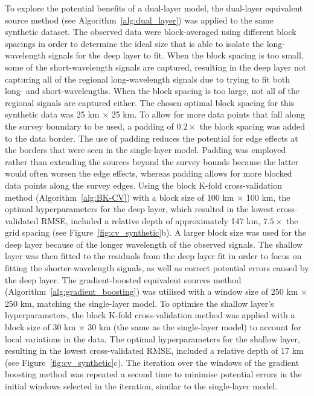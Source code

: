To explore the potential benefits of a dual-layer model, the dual-layer equivalent source method (see Algorithm~\ref{alg:dual_layer}) was applied to the same synthetic dataset. The observed data were block-averaged using different block spacings in order to determine the ideal size that is able to isolate the long-wavelength signals for the deep layer to fit. When the block spacing is too small, some of the short-wavelength signals are captured, resulting in the deep layer not capturing all of the regional long-wavelength signals due to trying to fit both long- and short-wavelengths. When the block spacing is too large, not all of the regional signals are captured either. The chosen optimal block spacing for this synthetic data was 25 km $\times$ 25 km. To allow for more data points that fall along the survey boundary to be used, a padding of $0.2 \times $ the block spacing was added to the data border. The use of padding reduces the potential for edge effects at the borders that were seen in the single-layer model. Padding was employed rather than extending the sources beyond the survey bounds because the latter would often worsen the edge effects, whereas padding allows for more blocked data points along the survey edges. Using the block K-fold cross-validation method (Algorithm~\ref{alg:BK-CV}) with a block size of 100 km $\times$ 100 km, the optimal hyperparameters for the deep layer, which resulted in the lowest cross-validated RMSE, included a relative depth of approximately 147 km, $7.5 \times$ the grid spacing (see Figure~\ref{fig:cv_synthetic}b). A larger block size was used for the deep layer because of the longer wavelength of the observed signals. The shallow layer was then fitted to the residuals from the deep layer fit in order to focus on fitting the shorter-wavelength signals, as well as correct potential errors caused by the deep layer. The gradient-boosted equivalent sources method (Algorithm~\ref{alg:gradient_boosting}) was utilised with a window size of 250 km $\times$ 250 km, matching the single-layer model. To optimise the shallow layer’s hyperparameters, the block K-fold cross-validation method was applied with a block size of 30 km $\times$ 30 km (the same as the single-layer model) to account for local variations in the data. The optimal hyperparameters for the shallow layer, resulting in the lowest cross-validated RMSE, included a relative depth of 17 km (see Figure~\ref{fig:cv_synthetic}c). The iteration over the windows of the gradient boosting method was repeated a second time to minimise potential errors in the initial windows selected in the iteration, similar to the single-layer model.

